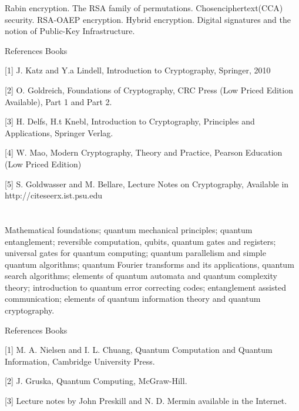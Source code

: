 Rabin encryption. The RSA family of permutations. Chosenciphertext(CCA) security. RSA-OAEP encryption. Hybrid encryption. Digital signatures and the notion of Public-Key Infrastructure. 

 

References Books 

 [1] J. Katz and Y.a Lindell, Introduction to Cryptography, Springer, 2010 

[2] O. Goldreich, Foundations of Cryptography, CRC Press (Low Priced Edition Available), Part 1 and Part 2. 

[3] H. Delfs, H.t Knebl, Introduction to Cryptography, Principles and Applications, Springer Verlag. 

[4] W. Mao, Modern Cryptography, Theory and Practice, Pearson Education (Low Priced Edition) 

[5] S. Goldwasser and M. Bellare, Lecture Notes on Cryptography, Available in http://citeseerx.ist.psu.edu 

 
\section{\dsccourseinfo}

 

Mathematical foundations; quantum mechanical principles; quantum entanglement; reversible computation, qubits, quantum gates and registers; universal gates for quantum computing; quantum parallelism and simple quantum algorithms; quantum Fourier transforms and its applications, quantum search algorithms; elements of quantum automata and quantum complexity theory; introduction to quantum error correcting codes; entanglement assisted communication; elements of quantum information theory and quantum cryptography. 

 

References Books 

 [1] M. A. Nielsen and I. L. Chuang, Quantum Computation and Quantum Information, Cambridge University Press. 

[2] J. Gruska, Quantum Computing, McGraw-Hill. 

[3] Lecture notes by John Preskill and N. D. Mermin available in the Internet. 

 
\section{\dsccourseinfo}

